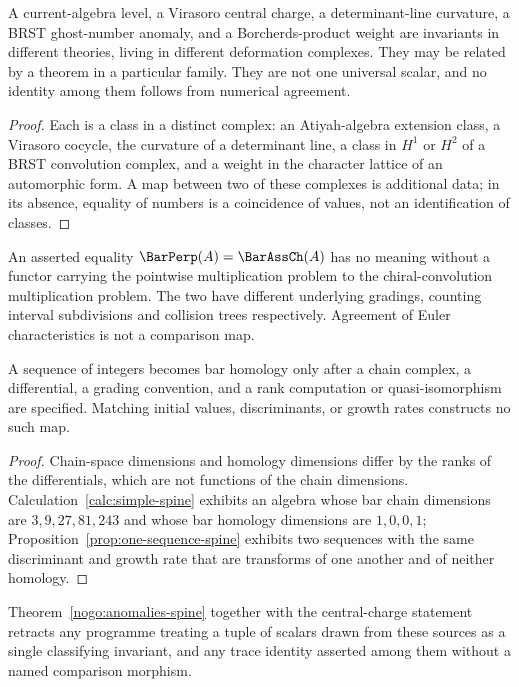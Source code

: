 \begin{theorem}
\label{nogo:anomalies-spine}
A current-algebra level, a Virasoro central charge, a determinant-line
curvature, a BRST ghost-number anomaly, and a Borcherds-product weight are
invariants in different theories, living in different deformation complexes.
They may be related by a theorem in a particular family. They are not one
universal scalar, and no identity among them follows from numerical agreement.
\end{theorem}
\begin{proof}
Each is a class in a distinct complex: an Atiyah-algebra extension class, a
Virasoro cocycle, the curvature of a determinant line, a class in $H^1$ or
$H^2$ of a BRST convolution complex, and a weight in the character lattice of
an automorphic form. A map between two of these complexes is additional data;
in its absence, equality of numbers is a coincidence of values, not an
identification of classes.
\end{proof}

\begin{theorem}
An asserted equality $\BarPerp(A)=\BarAssCh(A)$ has no meaning without a
functor carrying the pointwise multiplication problem to the chiral-convolution
multiplication problem. The two have different underlying gradings, counting
interval subdivisions and collision trees respectively. Agreement of Euler
characteristics is not a comparison map.
\end{theorem}

\begin{theorem}
\label{nogo:scalar-spine}
A sequence of integers becomes bar homology only after a chain complex, a
differential, a grading convention, and a rank computation or quasi-isomorphism
are specified. Matching initial values, discriminants, or growth rates
constructs no such map.
\end{theorem}
\begin{proof}
Chain-space dimensions and homology dimensions differ by the ranks of the
differentials, which are not functions of the chain dimensions.
Calculation~\ref{calc:simple-spine} exhibits an algebra whose bar chain
dimensions are $3,9,27,81,243$ and whose bar homology dimensions are $1,0,0,1$;
Proposition~\ref{prop:one-sequence-spine} exhibits two sequences with the same
discriminant and growth rate that are transforms of one another and of neither
homology.
\end{proof}

Theorem~\ref{nogo:anomalies-spine} together with the central-charge statement
retracts any programme treating a tuple of scalars drawn from these sources as
a single classifying invariant, and any trace identity asserted among them
without a named comparison morphism.
